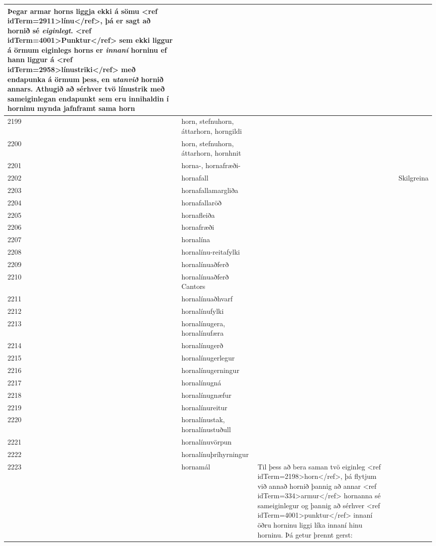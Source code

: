 \begin{longtable}{p{}|p{}|p{}|p{}|p{}}
Þegar armar horns liggja ekki á sömu <ref idTerm=2911>línu</ref>, þá er sagt að hornið sé \textit{eiginlegt}. <ref idTerm=4001>Punktur</ref> sem ekki liggur á örmum eiginlegs horns er \textit{innaní} horninu ef hann liggur á <ref idTerm=2958>línustriki</ref> með endapunka á örmum þess, en \textit{utanvið} hornið annars. Athugið að sérhver tvö línustrik með sameiginlegan endapunkt sem eru innihaldin í horninu mynda jafnframt sama horn & \\
\hline
2199 & horn, stefnuhorn, áttarhorn, horngildi &  &  &  \\
\hline
2200 & horn, stefnuhorn, áttarhorn, hornhnit &  &  &  \\
\hline
2201 & horna-, hornafræði- &  &  &  \\
\hline
2202 & hornafall &  &  & Skilgreina \\
\hline
2203 & hornafallamargliða &  &  &  \\
\hline
2204 & hornafallaröð &  &  &  \\
\hline
2205 & hornafleiða &  &  &  \\
\hline
2206 & hornafræði &  &  &  \\
\hline
2207 & hornalína &  &  &  \\
\hline
2208 & hornalínu-reitafylki &  &  &  \\
\hline
2209 & hornalínuaðferð &  &  &  \\
\hline
2210 & hornalínuaðferð Cantors &  &  &  \\
\hline
2211 & hornalínuaðhvarf &  &  &  \\
\hline
2212 & hornalínufylki &  &  &  \\
\hline
2213 & hornalínugera, hornalínufæra &  &  &  \\
\hline
2214 & hornalínugerð &  &  &  \\
\hline
2215 & hornalínugerlegur &  &  &  \\
\hline
2216 & hornalínugerningur &  &  &  \\
\hline
2217 & hornalínugná &  &  &  \\
\hline
2218 & hornalínugnæfur &  &  &  \\
\hline
2219 & hornalínureitur &  &  &  \\
\hline
2220 & hornalínustak, hornalínustuðull &  &  &  \\
\hline
2221 & hornalínuvörpun &  &  &  \\
\hline
2222 & hornalínuþríhyrningur &  &  &  \\
\hline
2223 & hornamál & Til þess að bera saman tvö eiginleg <ref idTerm=2198>horn</ref>, þá flytjum við annað hornið þannig að annar <ref idTerm=334>armur</ref> hornanna sé sameiginlegur og þannig að sérhver <ref idTerm=4001>punktur</ref> innaní öðru horninu liggi líka innaní hinu horninu. Þá getur þrennt gerst:


\end{longtable}

